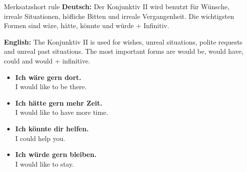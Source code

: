 \documentclass[a4paper,11pt]{article}
\newcommand{\GermanText}[1]{\textbf{Deutsch: }#1\par}
\newcommand{\EnglishText}[1]{{\small\color{SoftGray}\textbf{English: }#1\par}}
\newcommand{\ExampleItem}[2]{\item \textbf{#1}\\{\small\color{SoftGray}#2}}
\begin{document}
    \begin{grammarentry}{Merksatz}{short rule}
        \GermanText{Der Konjunktiv II wird benutzt für Wünsche, irreale Situationen, höfliche Bitten und irreale Vergangenheit. Die wichtigsten Formen sind wäre, hätte, könnte und würde + Infinitiv.}
        \EnglishText{The Konjunktiv II is used for wishes, unreal situations, polite requests and unreal past situations. The most important forms are would be, would have, could and would + infinitive.}
        
        \begin{exbox}
            \begin{itemize}
                \ExampleItem{Ich wäre gern dort.}{I would like to be there.}
                \ExampleItem{Ich hätte gern mehr Zeit.}{I would like to have more time.}
                \ExampleItem{Ich könnte dir helfen.}{I could help you.}
                \ExampleItem{Ich würde gern bleiben.}{I would like to stay.}
            \end{itemize}
        \end{exbox}
    \end{grammarentry}
    
\end{document}
